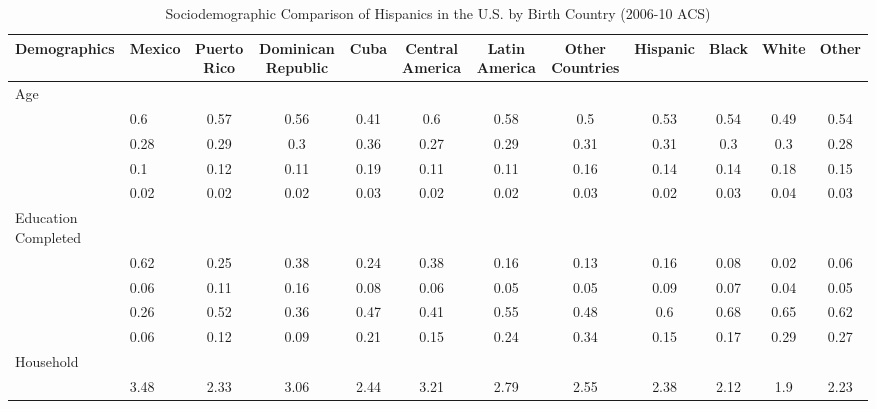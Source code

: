 \begin{table}[ht]
\centering
\caption{Sociodemographic Comparison of Hispanics in the U.S. by Birth Country (2006-10 ACS)} 
\begingroup\small
\begin{tabular}{>{\raggedright\arraybackslash}p{3.2cm}|lcccccc|cccc}
  \hline
Demographics & Mexico & Puerto Rico & Dominican Republic & Cuba & Central America & Latin America & Other Countries & Hispanic & Black & White & Other \\ 
  \hline
Age &  &  &  &  &  &  &  &  &  &  &  \\ 
  \multicolumn{1}{>{\raggedleft\arraybackslash}p{1.5cm}|}{\makebox[1.5cm][r]{60 - 69 }}& 0.6 & 0.57 & 0.56 & 0.41 & 0.6 & 0.58 & 0.5 & 0.53 & 0.54 & 0.49 & 0.54 \\ 
  \multicolumn{1}{>{\raggedleft\arraybackslash}p{1.5cm}|}{\makebox[1.5cm][r]{70 - 79 }}& 0.28 & 0.29 & 0.3 & 0.36 & 0.27 & 0.29 & 0.31 & 0.31 & 0.3 & 0.3 & 0.28 \\ 
  \multicolumn{1}{>{\raggedleft\arraybackslash}p{1.5cm}|}{\makebox[1.5cm][r]{80 - 89 }}& 0.1 & 0.12 & 0.11 & 0.19 & 0.11 & 0.11 & 0.16 & 0.14 & 0.14 & 0.18 & 0.15 \\ 
  \multicolumn{1}{>{\raggedleft\arraybackslash}p{1.5cm}|}{\makebox[1.5cm][r]{90 plus }}& 0.02 & 0.02 & 0.02 & 0.03 & 0.02 & 0.02 & 0.03 & 0.02 & 0.03 & 0.04 & 0.03 \\ 
  Education Completed &  &  &  &  &  &  &  &  &  &  &  \\ 
  \multicolumn{1}{>{\raggedleft\arraybackslash}p{3.2cm}|}{\makebox[3.2cm][r]{Less than Primary }}& 0.62 & 0.25 & 0.38 & 0.24 & 0.38 & 0.16 & 0.13 & 0.16 & 0.08 & 0.02 & 0.06 \\ 
  \multicolumn{1}{>{\raggedleft\arraybackslash}p{1.7cm}|}{\makebox[1.7cm][r]{Primary }}& 0.06 & 0.11 & 0.16 & 0.08 & 0.06 & 0.05 & 0.05 & 0.09 & 0.07 & 0.04 & 0.05 \\ 
  \multicolumn{1}{>{\raggedleft\arraybackslash}p{2cm}|}{\makebox[2cm][r]{Secondary }}& 0.26 & 0.52 & 0.36 & 0.47 & 0.41 & 0.55 & 0.48 & 0.6 & 0.68 & 0.65 & 0.62 \\ 
  \multicolumn{1}{>{\raggedleft\arraybackslash}p{2cm}|}{\makebox[2cm][r]{University }}& 0.06 & 0.12 & 0.09 & 0.21 & 0.15 & 0.24 & 0.34 & 0.15 & 0.17 & 0.29 & 0.27 \\ 
  Household &  &  &  &  &  &  &  &  &  &  &  \\ 
  \multicolumn{1}{>{\raggedleft\arraybackslash}p{2.7cm}|}{\makebox[2.7cm][r]{Household Size }}& 3.48 & 2.33 & 3.06 & 2.44 & 3.21 & 2.79 & 2.55 & 2.38 & 2.12 & 1.9 & 2.23 \\ 

\end{tabular}
\end{table}
